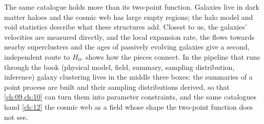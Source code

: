 The same catalogue holds more than its two-point function. Galaxies live in dark
matter haloes and the cosmic web has large empty regions; the halo model and
void statistics describe what these structures add. Closest to us, the galaxies'
velocities are measured directly, and the local expansion rate, the flows towards
nearby superclusters and the ages of passively evolving galaxies give a second,
independent route to $H_0$.  shows how the pieces connect.
In the pipeline that runs through the book (physical model, field, summary,
sampling distribution, inference) galaxy clustering lives in the middle three boxes:
the summaries of a point process are built and their sampling distributions
derived, so that \cref{ch:09,ch:10} can turn them into parameter
constraints, and the same catalogues hand \cref{ch:12} the cosmic web as a field whose shape the
two-point function does not see.

